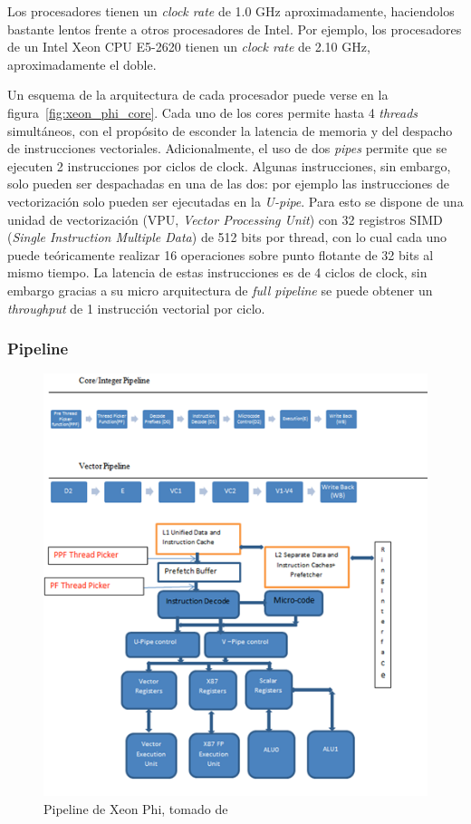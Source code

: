 Los procesadores tienen un \textit{clock rate} de 1.0 GHz aproximadamente, haciendolos bastante lentos frente
a otros procesadores de Intel. Por ejemplo, los procesadores de un Intel Xeon CPU E5-2620 tienen un \textit{clock rate}
de 2.10 GHz, aproximadamente el doble.

Un esquema de la arquitectura de cada procesador puede verse en la figura~\ref{fig:xeon_phi_core}. Cada uno de los cores
permite hasta 4 \textit{threads} simult\'aneos, con el prop\'osito de esconder la latencia de memoria y del despacho de
instrucciones vectoriales. Adicionalmente, el uso de dos \textit{pipes} permite que se ejecuten 2
instrucciones por ciclos de clock.  Algunas instrucciones, sin embargo, solo pueden ser despachadas en una de las dos:
por ejemplo las instrucciones de vectorizaci\'on solo pueden ser ejecutadas en la \textit{U-pipe}. Para esto se dispone
de una unidad de vectorizaci\'on (VPU, \textit{Vector Processing Unit}) con 32 registros SIMD (\textit{Single Instruction
Multiple Data}) de 512 bits por thread, con lo cual cada uno puede te\'oricamente realizar 16 operaciones sobre punto flotante de
32 bits al mismo tiempo. La latencia de estas instrucciones es de 4 ciclos de clock, sin embargo gracias a su micro
arquitectura de \textit{full pipeline} se puede obtener un \textit{throughput} de 1 instrucci\'on vectorial por ciclo.

\subsubsection{Pipeline}

\begin{figure}[htbp]
   \centering
   \includegraphics[width=\textwidth]{images/xeon-phi-pipeline.png}
   \caption{Pipeline de Xeon Phi, tomado de~\cite{XeonPhiBook} }
   \label{fig::xeon_phi_pipeline}
\end{figure}


